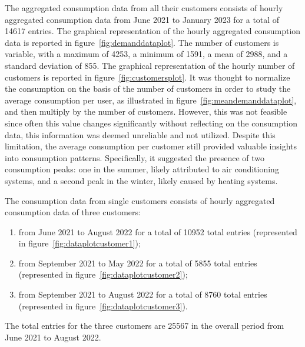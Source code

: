 The aggregated consumption data from all their customers consists of hourly aggregated consumption data from June 2021 to January 2023 for a total of 14617 entries.
The graphical representation of the hourly aggregated consumption data is reported in figure~\ref{fig:demanddataplot}.
The number of customers is variable, with a maximum of 4253, a minimum of 1591, a mean of 2988, and a standard deviation of 855.
The graphical representation of the hourly number of customers is reported in figure~\ref{fig:customersplot}.
It was thought to normalize the consumption on the basis of the number of customers in order to study the average consumption per user, as illustrated in figure~\ref{fig:meandemanddataplot}, and then multiply by the number of customers.
However, this was not feasible since often this value changes significantly without reflecting on the consumption data, this information was deemed unreliable and not utilized.
Despite this limitation, the average consumption per customer still provided valuable insights into consumption patterns.
Specifically, it suggested the presence of two consumption peaks: one in the summer, likely attributed to air conditioning systems, and a second peak in the winter, likely caused by heating systems.

The consumption data from single customers consists of hourly aggregated consumption data of three customers:
\begin{enumerate}
  \item from June 2021 to August 2022 for a total of 10952 total entries (represented in figure~\ref{fig:dataplotcustomer1});
  \item from September 2021 to May 2022 for a total of 5855 total entries (represented in figure~\ref{fig:dataplotcustomer2});
  \item from September 2021 to August 2022 for a total of 8760 total entries (represented in figure~\ref{fig:dataplotcustomer3}).
\end{enumerate}
The total entries for the three customers are 25567 in the overall period from June 2021 to August 2022.


